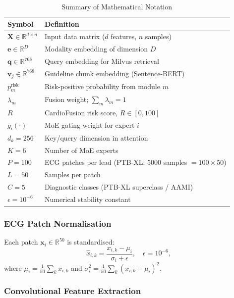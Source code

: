 \documentclass[AMA,STIX1COL,]{WileyNJD-v2}
\begin{document}
\begin{table}[!t]
\caption{Summary of Mathematical Notation}
\label{tab:notation}
\centering
\renewcommand{\arraystretch}{1.1}
\begin{tabular}{lp{4.3cm}}
\toprule
\textbf{Symbol} & \textbf{Definition}\\
\midrule
$\mathbf{X} \in \mathbb{R}^{d \times n}$ &
  Input data matrix ($d$ features, $n$ samples)\\
$\mathbf{e} \in \mathbb{R}^D$ &
  Modality embedding of dimension $D$\\
$\mathbf{q} \in \mathbb{R}^{768}$ &
  Query embedding for Milvus retrieval\\
$\mathbf{v}_j \in \mathbb{R}^{768}$ &
  Guideline chunk embedding (Sentence-BERT)\\
$p^{\text{risk}}_m$ &
  Risk-positive probability from module $m$\\
$\lambda_m$ &
  Fusion weight; $\sum_m \lambda_m = 1$\\
$R$ &
  CardioFusion risk score, $R \in [0,100]$\\
$g_i(\cdot)$ &
  MoE gating weight for expert $i$\\
$d_k = 256$ & Key/query dimension in attention\\
$K = 6$     & Number of MoE experts\\
$P = 100$   & ECG patches per lead (PTB-XL: 5000 samples $=100\times50$)\\
$L = 50$    & Samples per patch\\
$C = 5$     & Diagnostic classes (PTB-XL superclass / AAMI)\\
$\epsilon = 10^{-6}$ & Numerical stability constant\\
\bottomrule
\end{tabular}
\end{table}

\subsubsection{ECG Patch Normalisation}

Each patch $\mathbf{x}_i \in \mathbb{R}^{50}$ is standardised:
\begin{equation}
\hat{x}_{i,k} = \frac{x_{i,k} - \mu_i}{\sigma_i + \epsilon},
\quad \epsilon = 10^{-6},
\label{eq:norm}
\end{equation}
where $\mu_i = \tfrac{1}{50}\sum_k x_{i,k}$ and
$\sigma_i^2 = \tfrac{1}{50}\sum_k (x_{i,k} - \mu_i)^2$.

\subsubsection{Convolutional Feature Extraction}
\end{document}
